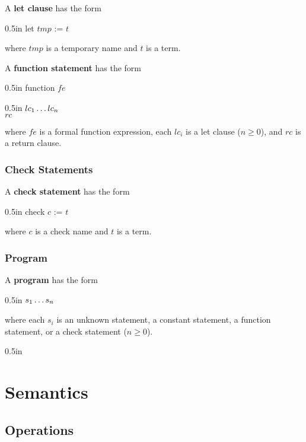 \documentclass[letterpaper, 12pt]{extarticle}
\theoremstyle{definition} %
\newcommand{\textdef}[1]{\textbf{#1}}
\newenvironment{codeblock}
    {\begin{addmargin}{0.5in} \ttfamily}
    {\end{addmargin}}
\begin{document}
A \textdef{let clause} has the form
\begin{codeblock}
let $tmp$ := $t$
\end{codeblock}
where $tmp$ is a temporary name and $t$ is a term.

A \textdef{function statement} has the form
\begin{codeblock}
function $fe$
    \begin{codeblock}
    $lc_1 \\
    \ldots \\
    lc_n$ \\
    $rc$
    \end{codeblock}
\end{codeblock}
where $fe$ is a formal function expression,
each $lc_i$ is a let clause ($n \ge 0$), and
$rc$ is a return clause.

\subsubsection{Check Statements}

A \textdef{check statement} has the form
\begin{codeblock}
check $c$ := $t$
\end{codeblock}
where $c$ is a check name and $t$ is a term.

\subsubsection{Program}

A \textdef{program} has the form
\begin{codeblock}
$s_1 \\
\ldots \\
s_n$
\end{codeblock}
where each $s_i$ is an unknown statement,
a constant statement, a function statement, or
a check statement ($n \ge 0$).


\begin{codeblock}

\end{codeblock}

\section{Semantics}

\subsection{Operations}
\end{document}
